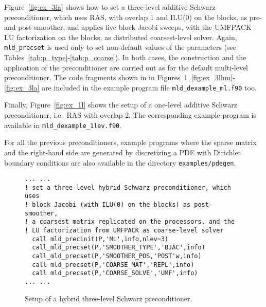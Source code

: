 Figure~\ref{fig:ex_3la} shows how to
set a three-level additive Schwarz preconditioner,
which uses RAS, with overlap 1 and ILU(0) on the blocks, 
as pre- and post-smoother, and applies five block-Jacobi sweeps, with
the UMFPACK LU factorization on the blocks, as distributed coarsest-level
solver. Again, \verb|mld_precset| is used only to set
non-default values of the parameters (see Tables~\ref{tab:p_type}-\ref{tab:p_coarse}).
In both cases, the construction and the application of the preconditioner
are carried out as for the default multi-level preconditioner.
The code fragments shown in in
Figures~\ref{fig:ex_3lh}~\ref{fig:ex_3lhm}-\ref{fig:ex_3la} are
included in the example program file \verb|mld_dexample_ml.f90| too. 

Finally, Figure~\ref{fig:ex_1l} shows the setup of a one-level
additive Schwarz preconditioner, i.e.\ RAS with overlap 2. The
corresponding example program is available in \verb|mld_dexample_1lev.f90|. 

For all the previous preconditioners, example programs where the sparse matrix and
the right-hand side are generated by discretizing a PDE with Dirichlet
boundary conditions are also available in the directory \verb|examples/pdegen|.



\begin{figure}[tbh]
\begin{center}
\begin{minipage}{.90\textwidth} 
{\small
\begin{verbatim}
... ...
! set a three-level hybrid Schwarz preconditioner, which uses 
! block Jacobi (with ILU(0) on the blocks) as post-smoother,
! a coarsest matrix replicated on the processors, and the 
! LU factorization from UMFPACK as coarse-level solver
  call mld_precinit(P,'ML',info,nlev=3)
  call_mld_precset(P,'SMOOTHER_TYPE','BJAC',info)
  call_mld_precset(P,'SMOOTHER_POS,'POST'w,info)
  call mld_precset(P,'COARSE_MAT','REPL',info)
  call mld_precset(P,'COARSE_SOLVE','UMF',info)
... ...
\end{verbatim}
}
\end{minipage}

\caption{Setup of a hybrid three-level Schwarz preconditioner.\label{fig:ex_3lh}}
\end{center}
\end{figure}


